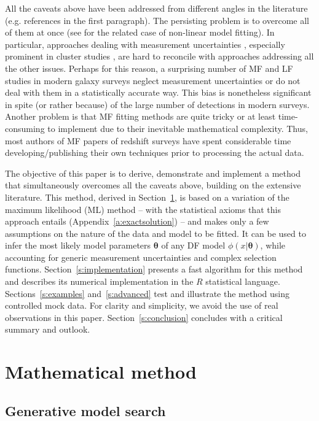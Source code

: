 \documentclass[a4paper,fleqn,usenatbib]{mnras}
\newcommand{\s}[1]{Section~\ref{s:#1}}
\renewcommand{\a}[1]{Appendix~\ref{a:#1}}
\newcommand{\eg}{e.g.\xspace}
\newcommand{\para}{{\bm{\theta}}}
\begin{document}
All the caveats above have been addressed from different angles in the literature (\eg references in the first paragraph). The persisting problem is to overcome all of them at once (see \citealp{Pihajoki2017} for the related case of non-linear model fitting). In particular, approaches dealing with measurement uncertainties \cite[\eg][]{Teerikorpi2004}, especially prominent in cluster studies \citep{Mortonson2011,Evrard2014}, are hard to reconcile with approaches addressing all the other issues. Perhaps for this reason, a surprising number of MF and LF studies in modern galaxy surveys neglect measurement uncertainties or do not deal with them in a statistically accurate way. This bias is nonetheless significant in spite (or rather because) of the large number of detections in modern surveys. Another problem is that MF fitting methods are quite tricky or at least time-consuming to implement due to their inevitable mathematical complexity. Thus, most authors of MF papers of redshift surveys have spent considerable time developing/publishing their own techniques prior to processing the actual data.

The objective of this paper is to derive, demonstrate and implement a method that simultaneously overcomes all the caveats above, building on the extensive literature. This method, derived in \s{method}, is based on a variation of the maximum likelihood (ML) method -- with the statistical axioms that this approach entails (\a{exactsolution}) -- and makes only a few assumptions on the nature of the data and model to be fitted. It can be used to infer the most likely model parameters $\para$ of any DF model $\phi(x|\para)$, while accounting for generic measurement uncertainties and complex selection functions. \s{implementation} presents a fast algorithm for this method and describes its numerical implementation in the $R$ statistical language. Sections~\ref{s:examples} and~\ref{s:advanced} test and illustrate the method using controlled mock data. For clarity and simplicity, we avoid the use of real observations in this paper. \s{conclusion} concludes with a critical summary and outlook.


\section{Mathematical method}\label{s:method}

\subsection{Generative model search}\label{ss:likelihood}
\end{document}
